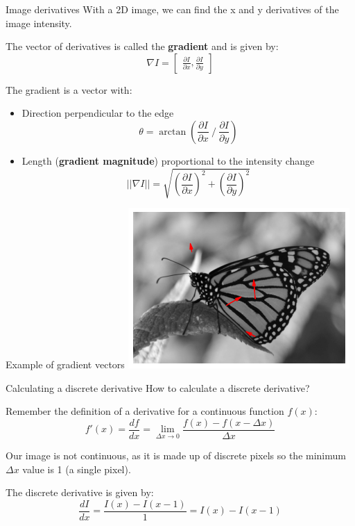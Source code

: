 \documentclass[9pt, aspectratio=169]{beamer}
\begin{document}
\begin{frame}
    {Image derivatives}
    With a 2D image, we can find the x and y derivatives of the image intensity.

    The vector of derivatives is called the \textbf{gradient} and is given by:
    \Large
    $$\nabla I = \begin{bmatrix}\frac{\partial I}{\partial x}, \frac{\partial I}{\partial y}\end{bmatrix}$$

    \normalsize

    The gradient is a vector with:
    \begin{itemize}
        \item Direction perpendicular to the edge
              $$\theta = \arctan\left(\frac{\partial I}{\partial x} \mathbin{/} \frac{\partial I}{\partial y}\right)$$
              \pause
        \item Length (\textbf{gradient magnitude}) proportional to the intensity change
              $$\lvert\lvert\nabla I\rvert\rvert = \sqrt{\left(\frac{\partial I}{\partial x}\right)^2 + \left(\frac{\partial I}{\partial y}\right)^2}$$
    \end{itemize}
\end{frame}

\begin{frame}
    {Example of gradient vectors}
    \centering
    \includegraphics[width=.7\textwidth]{monarch_gradient.png}
\end{frame}

\begin{frame}
    {Calculating a discrete derivative}
    How to calculate a discrete derivative?

    Remember the definition of a derivative for a continuous function $f(x)$:
    $$f'(x) = \frac{df}{dx} = \lim_{\Delta x \rightarrow 0} \frac{f(x) - f(x - \Delta x)}{\Delta x}$$

    \pause
    Our image is not continuous, as it is made up of discrete pixels so the minimum $\Delta x$ value is 1 (a single pixel).

    \pause
    The discrete derivative is given by:
    $$\frac{dI}{dx} = \frac{I(x) - I(x-1)}{1} = I(x) - I(x-1)$$
\end{frame}
\end{document}
